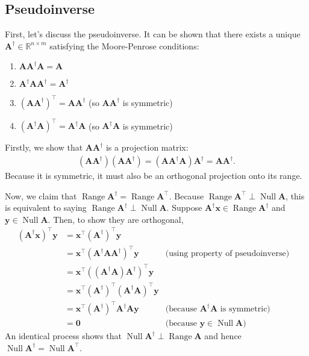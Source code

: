 \documentclass[12pt,a4paper]{article} %
\DeclareMathOperator{\Range}{Range}
\DeclareMathOperator{\Null}{Null}
\begin{document}
\subsection{Pseudoinverse}
First, let's discuss the pseudoinverse.
It can be shown that there exists a unique $\mathbf A^\dagger \in \mathbb R^{n \times m}$ satisfying the Moore-Penrose conditions:
\begin{enumerate}
    \item $\mathbf A \mathbf A^\dagger \mathbf A = \mathbf A$
    \item $\mathbf A^\dagger \mathbf A \mathbf A^\dagger = \mathbf A^\dagger$
    \item $(\mathbf A \mathbf A^\dagger)^\top = \mathbf A \mathbf A^\dagger$ (so $\mathbf A \mathbf A^\dagger$ is symmetric)
    \item $(\mathbf A^\dagger \mathbf A)^\top = \mathbf A^\dagger \mathbf A$ (so $\mathbf A^\dagger \mathbf A$ is symmetric)
\end{enumerate}
Firstly, we show that $\mathbf A \mathbf A^\dagger$ is a projection matrix:
\begin{align*}
    (\mathbf A \mathbf A^\dagger) (\mathbf A \mathbf A^\dagger) = (\mathbf A \mathbf A^\dagger \mathbf A) \mathbf A^\dagger = \mathbf A \mathbf A^\dagger.
\end{align*}
Because it is symmetric, it must also be an orthogonal projection onto its range.

Now, we claim that $\Range \mathbf A^\dagger = \Range \mathbf A^\top$. Because $\Range \mathbf A^\top \perp \Null \mathbf A$, this is 
equivalent to saying $\Range \mathbf A^\dagger \perp \Null \mathbf A$. Suppose $\mathbf A^\dagger \bm x \in \Range \mathbf A^\dagger$ and $\bm y \in \Null \mathbf A$. Then,
to show they are orthogonal,
\begin{align*}
    (\mathbf A^\dagger \bm x)^\top \bm y &= \bm x^\top (\mathbf A^\dagger)^\top \bm y \\ 
    &= \bm x^\top (\mathbf A^\dagger \mathbf A\mathbf A^\dagger)^\top \bm y& \text{(using property of pseudoinverse)}&\\ 
    &= \bm x^\top ((\mathbf A^\dagger \mathbf A)\mathbf A^\dagger)^\top \bm y \\ 
    &= \bm x^\top (\mathbf A^\dagger)^\top (\mathbf A^\dagger\mathbf A)^\top \bm y \\ 
    &= \bm x^\top  (\mathbf A^\dagger)^\top \mathbf A^\dagger\mathbf A \bm y & \text{(because $\mathbf A^\dagger \mathbf A$ is symmetric)}\\ 
    &= \bm 0 & \text{(because $\bm y \in \Null \mathbf A$)}
\end{align*}
An identical process shows that $\Null \mathbf A^\dagger \perp \Range \mathbf A$ and hence
$\Null \mathbf A^\dagger = \Null \mathbf A^\top$.
\end{document}
